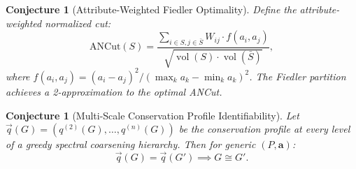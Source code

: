 \documentclass[12pt,letterpaper]{article}
\newtheorem{conjecture}[theorem]{Conjecture}
\newcommand{\bfa}{\mathbf{a}}
\newcommand{\vol}{\operatorname{vol}}
\begin{document}
\begin{conjecture}[Attribute-Weighted Fiedler Optimality]
Define the attribute-weighted normalized cut:
\[
  \mathrm{ANCut}(S) = \frac{\sum_{i \in S, j \in \bar{S}} W_{ij} \cdot f(a_i, a_j)}{\sqrt{\vol(S) \cdot \vol(\bar{S})}},
\]
where $f(a_i, a_j) = (a_i - a_j)^2 / (\max_k a_k - \min_k a_k)^2$. The Fiedler partition achieves a 2-approximation to the optimal ANCut.
\end{conjecture}

\begin{conjecture}[Multi-Scale Conservation Profile Identifiability]
Let $\vec{q}(G) = (q^{(2)}(G), \ldots, q^{(n)}(G))$ be the conservation profile at every level of a greedy spectral coarsening hierarchy. Then for generic $(P, \bfa)$:
\[
  \vec{q}(G) = \vec{q}(G') \implies G \cong G'.
\]
\end{conjecture}
\end{document}
